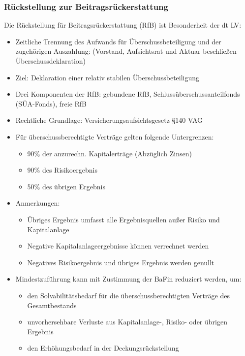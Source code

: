 \documentclass[12pt]{report}
\theoremstyle{dotless}
\theoremstyle{definition}
\begin{document}
\subsubsection{Rückstellung zur Beitragsrückerstattung}
Die Rückstellung für Beitragsrückerstattung (RfB) ist Besonderheit der dt LV:
\begin{itemize}
\item Zeitliche Trennung des Aufwands für Überschussbeteiligung und der zugehörigen Auszahlung: (Vorstand, Aufsichtsrat und Aktuar beschließen Überschussdeklaration)
\item Ziel: Deklaration einer relativ stabilen Überschussbeteiligung
\item Drei Komponenten der RfB: gebundene RfB, Schlussüberschussanteilfonds (SÜA-Fonds), freie RfB
\item Rechtliche Grundlage: Versicherungsaufsichtsgesetz §140 VAG
\item Für überschussberechtigte Verträge gelten folgende Untergrenzen:
\begin{itemize}
\item 90\% der anzurechn. Kapitalerträge (Abzüglich Zinsen)
\item 90\% des Risikoergebnis
\item 50\% des übrigen Ergebnis
\end{itemize}
\item Anmerkungen:
\begin{itemize}
\item Übriges Ergebnis umfasst alle Ergebnisquellen außer Risiko und Kapitalanlage
\item Negative Kapitalanlageergebnisse können verrechnet werden
\item Negatives Risikoergebnis und übriges Ergebnis werden genullt
\end{itemize}
\item Mindestzuführung kann mit Zustimmung der BaFin reduziert werden, um:
\begin{itemize}
\item den Solvabilitätsbedarf für die überschussberechtigten Verträge des Gesamtbestands
\item unvorhersehbare Verluste aus Kapitalanlage-, Risiko- oder übrigen Ergebnis
\item den Erhöhungsbedarf in der Deckungsrückstellung
\end{itemize}
\end{itemize}
\end{document}
